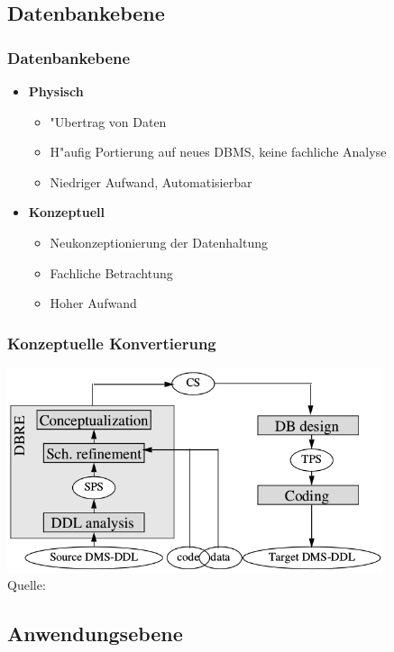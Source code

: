 \documentclass{beamer}
\begin{document}
	\subsection{Datenbankebene}
	
	\begin{frame}
		\frametitle{Datenbankebene}
		
		\begin{itemize}
			\item \textbf{Physisch}
				\begin{itemize}
					\item "Ubertrag von Daten
					\item H"aufig Portierung auf neues DBMS, keine fachliche Analyse
					\item Niedriger Aufwand, Automatisierbar
				\end{itemize}
			\item \textbf{Konzeptuell}
				\begin{itemize}
					\item Neukonzeptionierung der Datenhaltung
					\item Fachliche Betrachtung
					\item Hoher Aufwand
				\end{itemize}
		\end{itemize}
	\end{frame}	
	
	\begin{frame}
		\frametitle{Konzeptuelle Konvertierung}
		
		\centering
		\includegraphics[height = 6cm]{../images/strategies_fig_02b.png}\\
		\tiny Quelle: \cite{henrard-2002}
	\end{frame}
	
	\subsection{Anwendungsebene}
	
\end{document}
